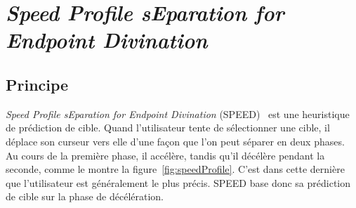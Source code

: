 \section{\emph{Speed Profile sEparation for Endpoint Divination}}
	\subsection{Principe}
	\emph{Speed Profile sEparation for Endpoint Divination} (SPEED)~\cite{wonner2011speed} est une heuristique de prédiction de cible. Quand l'utilisateur tente de sélectionner une cible, il déplace son curseur vers elle d'une façon que l'on peut séparer en deux phases. Au cours de la première phase, il accélère, tandis qu'il décélère pendant la seconde, comme le montre la figure~\ref{fig:speedProfile}. C'est dans cette dernière que l'utilisateur est généralement le plus précis. SPEED base donc sa prédiction de cible sur la phase de décélération.
	
